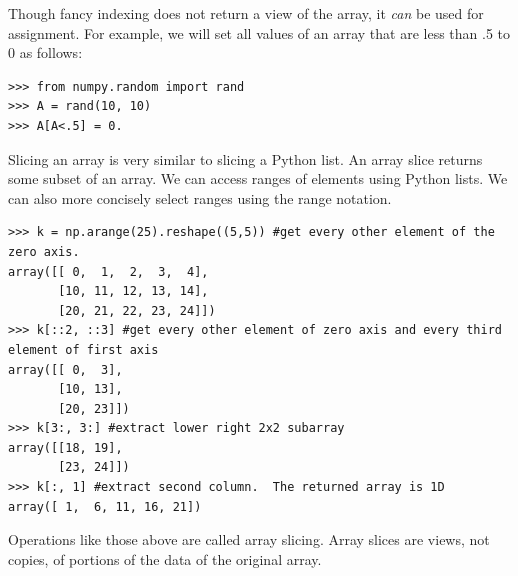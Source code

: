 Though fancy indexing does not return a view of the array, it \emph{can} be used for assignment.
For example, we will set all values of an array that are less than .5 to 0 as follows:
\begin{lstlisting}
>>> from numpy.random import rand
>>> A = rand(10, 10)
>>> A[A<.5] = 0.
\end{lstlisting}

Slicing an array is very similar to slicing a Python list.  An array slice returns some subset of an array.  
We can access ranges of elements using Python lists.
We can also more concisely select ranges using the  range notation.
\begin{lstlisting}
>>> k = np.arange(25).reshape((5,5)) #get every other element of the zero axis.
array([[ 0,  1,  2,  3,  4],
       [10, 11, 12, 13, 14],
       [20, 21, 22, 23, 24]])
>>> k[::2, ::3] #get every other element of zero axis and every third element of first axis
array([[ 0,  3],
       [10, 13],
       [20, 23]])
>>> k[3:, 3:] #extract lower right 2x2 subarray
array([[18, 19],
       [23, 24]])
>>> k[:, 1] #extract second column.  The returned array is 1D
array([ 1,  6, 11, 16, 21])
\end{lstlisting}
Operations like those above are called array slicing.
Array slices are views, not copies, of portions of the data of the original array.


